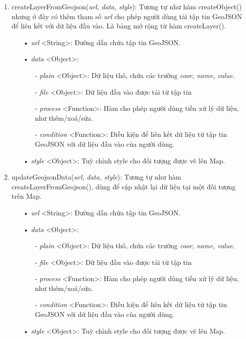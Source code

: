 \documentclass[12pt,a4paper,twoside]{article}
\begin{document}
\begin{enumerate}
\item \textsf{createLayerFromGeojson(\textit{url, data, style})}: Tương tự như hàm \textsf{createObject()} nhưng ở đây có thêm tham số \textit{url} cho phép người dùng tải tập tin GeoJSON để liên kết với dữ liệu đầu vào. Là bảng mở rộng từ hàm \textsf{createLayer()}.
	\begin{itemize}
		\item[•] \textit{url} <String>: Đường dẫn chứa tập tin GeoJSON.
		\item[•] \textit{data} <Object>:
		\begin{itemize}
			\item[-] \emph{plain} <Object>: Dữ liệu thô, chứa các trường \textit{coor, name, value}.
			\item[-] \emph{file} <Object>: Dữ liệu đầu vào được tải từ tập tin
			\item[-] \emph{process} <Function>: Hàm cho phép người dùng tiền xử lý dữ liệu, như thêm/xoá/sửa.
			\item[-] \emph{condition} <Function>: Điều kiện để liên kết dữ liệu từ tập tin GeoJSON với dữ liệu đầu vào của người dùng. 
		\end{itemize}
		\item[•] \textit{style} <Object>: Tuỳ chỉnh style cho đối tượng được vẽ lên Map.
	\end{itemize}
	
\item \textsf{updateGeojsonData(\textit{url, data, style})}: Tương tự như hàm \textsf{createLayerFromGeojson()}, dùng để cập nhật lại dữ liệu tại một đối tượng trên Map.
	\begin{itemize}
		\item[•] \textit{url} <String>: Đường dẫn chứa tập tin GeoJSON.
		\item[•] \textit{data} <Object>:
		\begin{itemize}
			\item[-] \emph{plain} <Object>: Dữ liệu thô, chứa các trường \textit{coor, name, value}.
			\item[-] \emph{file} <Object>: Dữ liệu đầu vào được tải từ tập tin
			\item[-] \emph{process} <Function>: Hàm cho phép người dùng tiền xử lý dữ liệu, như thêm/xoá/sửa.
			\item[-] \emph{condition} <Function>: Điều kiện để liên kết dữ liệu từ tập tin GeoJSON với dữ liệu đầu vào của người dùng. 
		\end{itemize}
		\item[•] \textit{style} <Object>: Tuỳ chỉnh style cho đối tượng được vẽ lên Map.
	\end{itemize}
	

\end{enumerate}
\end{document}
